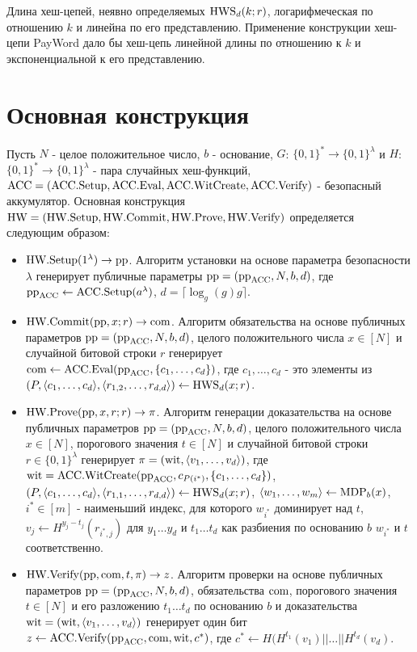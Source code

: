 Длина хеш-цепей, неявно определяемых $\text{HWS}_d(k; r)$, логарифмеческая по отношению $k$ и линейна по его представлению.
Применение конструкции хеш-цепи PayWord \cite{10.1007/3-540-62494-5_6} дало бы хеш-цепь линейной длины по отношению к $k$ и экспоненциальной к его представлению.

\section{Основная конструкция} %
\begin{definition}
	Пусть $N$ - целое положительное число, $b$ - основание, $G$: $\{0, 1\}^* \rightarrow \{0, 1\}^\lambda$ и $H$: $\{0, 1\}^* \rightarrow \{0, 1\}^\lambda$ - пара случайных хеш-функций, $\text{ACC} = (\text{ACC}.\text{Setup}, \text{ACC}.\text{Eval}, \text{ACC}.\text{WitCreate}, \text{ACC}.\text{Verify})$ - безопасный аккумулятор.
	Основная конструкция $\text{HW} = (\text{HW}.\text{Setup}, \text{HW}.\text{Commit}, \text{HW}.\text{Prove}, \text{HW}.\text{Verify})$ определяется следующим образом:
	\begin{itemize}
		\item $\text{HW}.\text{Setup}(1^\lambda) \rightarrow \text{pp}$. Алгоритм установки на основе параметра безопасности $\lambda$ генерирует публичные параметры $\text{pp} = (\text{pp}_{\text{ACC}}, N, b, d)$, где $\text{pp}_{\text{ACC}} \leftarrow \text{ACC}.\text{Setup}(a^\lambda)$, $d = \lceil \log_g(g)g\rceil$.
		\item $\text{HW}.\text{Commit}(\text{pp}, x; r) \rightarrow \text{com}$. Алгоритм обязательства на основе публичных параметров $\text{pp} = (\text{pp}_{\text{ACC}}, N, b, d)$, целого положительного числа $x \in [N]$ и случайной битовой строки $r$ генерирует $\text{com} \leftarrow \text{ACC}.\text{Eval}(\text{pp}_{\text{ACC}}, \{c_1, \dots, c_d\})$, где $c_1, \dots, c_d$ - это элементы из $(P, \langle c_1, \dots, c_d \rangle, \langle r_{1, 2}, \dots, r_{d, d} \rangle) \leftarrow \text{HWS}_d(x; r)$.
		\item $\text{HW}.\text{Prove}(\text{pp}, x, r; r) \rightarrow \pi$. Алгоритм генерации доказательства на основе публичных параметров $\text{pp} = (\text{pp}_{\text{ACC}}, N, b, d)$, целого положительного числа $x \in [N]$, порогового значения $t \in [N]$ и случайной битовой строки $r \in \{0, 1\}^\lambda$ генерирует $\pi = (\text{wit}, \langle v_1, \dots, v_d \rangle)$, где $\text{wit} = \text{ACC}.\text{WitCreate}(\text{pp}_{\text{ACC}}, c_{P(i^*)}, \{c_1, \dots, c_d\})$, $(P, \langle c_1, \dots, c_d \rangle, \langle r_{1, 1}, \dots, r_{d, d} \rangle) \leftarrow \text{HWS}_d(x; r)$, $\langle w_1, \dots, w_m \rangle \leftarrow \text{MDP}_b(x)$, $i^* \in [m]$ - наименьший индекс, для которого $w_{i^*}$ доминирует над $t$, $v_j \leftarrow H^{y_j - t_j}(r_{i^*, j})$ для $y_1 \dots y_d$ и $t_1 \dots t_d$ как разбиения по основанию $b$ $w_{i^*}$ и $t$ соответственно.
		\item $\text{HW}.\text{Verify}(\text{pp}, \text{com}, t, \pi) \rightarrow z$. Алгоритм проверки на основе публичных параметров $\text{pp} = (\text{pp}_{\text{ACC}}, N, b, d)$, обязательства $\text{com}$, порогового значения $t \in [N]$ и его разложению $t_1 \dots t_d$ по основанию $b$ и доказательства $\text{wit} = (\text{wit}, \langle v_1, \dots, v_d \rangle)$ генерирует один бит $z \leftarrow \text{ACC}.\text{Verify}(\text{pp}_{\text{ACC}}, \text{com}, \text{wit}, c^*)$, где $c^* \leftarrow H(H^{t_1}(v_1) || \dots || H^{t_d}(v_d)$.
	\end{itemize}
\end{definition}
